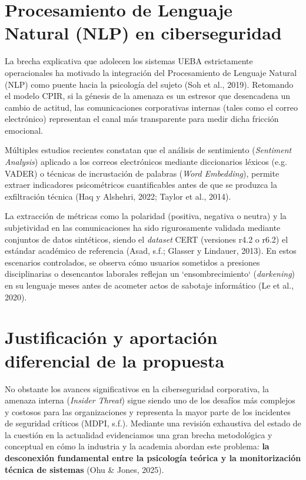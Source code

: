 \documentclass[IB]{TFUOC}%
\begin{document}
\section{Procesamiento de Lenguaje Natural (NLP) en ciberseguridad}

La brecha explicativa que adolecen los sistemas UEBA estrictamente operacionales ha motivado la integración del Procesamiento de Lenguaje Natural (NLP) como puente hacia la psicología del sujeto (Soh et al., 2019). Retomando el modelo CPIR, si la génesis de la amenaza es un estresor que desencadena un cambio de actitud, las comunicaciones corporativas internas (tales como el correo electrónico) representan el canal más transparente para medir dicha fricción emocional.

\medskip
\noindent Múltiples estudios recientes constatan que el análisis de sentimiento (\textit{Sentiment Analysis}) aplicado a los correos electrónicos mediante diccionarios léxicos (e.g. VADER) o técnicas de incrustación de palabras (\textit{Word Embedding}), permite extraer indicadores psicométricos cuantificables antes de que se produzca la exfiltración técnica (Haq y Alshehri, 2022; Taylor et al., 2014).

\medskip
\noindent La extracción de métricas como la polaridad (positiva, negativa o neutra) y la subjetividad en las comunicaciones ha sido rigurosamente validada mediante conjuntos de datos sintéticos, siendo el \textit{dataset} CERT (versiones r4.2 o r6.2) el estándar académico de referencia (Asad, s.f.; Glasser y Lindauer, 2013). En estos escenarios controlados, se observa cómo usuarios sometidos a presiones disciplinarias o desencantos laborales reflejan un `ensombrecimiento` (\textit{darkening}) en su lenguaje meses antes de acometer actos de sabotaje informático (Le et al., 2020).

\section{Justificación y aportación diferencial de la propuesta}

No obstante los avances significativos en la ciberseguridad corporativa, la amenaza interna (\textit{Insider Threat}) sigue siendo uno de los desafíos más complejos y costosos para las organizaciones y representa la mayor parte de los incidentes de seguridad críticos (MDPI, s.f.). Mediante una revisión exhaustiva del estado de la cuestión en la actualidad evidenciamos una gran brecha metodológica y conceptual en cómo la industria y la academia abordan este problema: \textbf{la desconexión fundamental entre la psicología teórica y la monitorización técnica de sistemas} (Ohu \& Jones, 2025).
\end{document}
